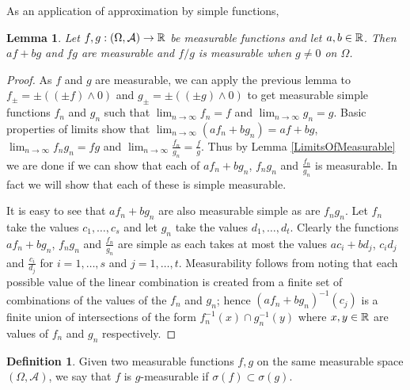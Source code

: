 \documentclass{amsart}
\newtheorem{lem}[thm]{Lemma}
\theoremstyle{remark}
\theoremstyle{definition}
\newtheorem{defn}[thm]{Definition}
\begin{document}
As an application of approximation by simple functions, 
\begin{lem}
Let $f,g : (\Omega, \mathcal{A}) \to \mathbb{R}$ be measurable functions
and let $a,b \in \mathbb{R}$.  Then $af + bg$ and $fg$ are measurable and
$f/g$ is measurable when $g \neq 0$ on $\Omega$.
\end{lem}
\begin{proof}As $f$ and $g$ are measurable, we can apply the previous
  lemma to $f_\pm = \pm((\pm f) \wedge 0)$ and $g_{\pm} = \pm((\pm g) \wedge 0)$
  to get measurable simple functions $f_n$ and $g_n$ such that $\lim_{n \to
    \infty} f_n = f$ and $\lim_{n \to
    \infty} g_n = g$.  Basic properties of limits show that $\lim_{n
    \to \infty} (a f_n + b g_n) = a f + b g$, $\lim_{n \to \infty} f_n
  g_n = f g$ and $\lim_{n \to \infty} \frac{f_n}{  g_n} =
  \frac{f}{g}$.  Thus by Lemma \ref{LimitsOfMeasurable} we are done if
  we can show that each of $a f_n + b g_n$, $f_n g_n$ and
  $\frac{f_n}{g_n}$ is measurable.  In fact we will show that each of
  these is simple measurable.

It is easy to see that $a f_n + b g_n$ are also
  measurable simple as are $f_n g_n$.  Let $f_n$ take the values $c_1,
  \dots, c_s$ and let $g_n$ take the values $d_1, \dots, d_t$.  
Clearly the functions  $a f_n + b g_n$, $f_n g_n$ and
  $\frac{f_n}{g_n}$ are simple as each takes at most the values  $a c_i + b d_j$, $c_i d_j$ and
  $\frac{c_i}{d_j}$ for $i=1,\dots,s$ and $j=1,\dots, t$.  
Measurability follows from noting that each
  possible value of the linear combination is created from a finite
  set of combinations of the values of the $f_n$ and $g_n$; hence
  $(af_n + bg_n)^{-1}(c_j)$ is a finite union of intersections of the
  form $f_n^{-1}(x) \cap g_n^{-1}(y)$ where $x,y \in \mathbb{R}$ are
  values of $f_n$ and $g_n$ respectively.
\end{proof}

\begin{defn}Given two measurable functions $f,g$ on the same measurable space
  $(\Omega, \mathcal{A})$, we say that $f$ is $g$-measurable if
  $\sigma(f) \subset \sigma(g)$.
\end{defn}
\end{document}
